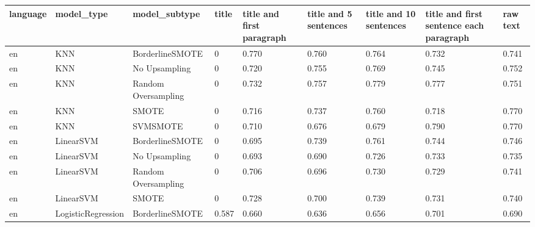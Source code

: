 \begin{tabular}{lllllllll}
\toprule
language &                   model\_type &       model\_subtype & title & title and first paragraph & title and 5 sentences & title and 10 sentences & title and first sentence each paragraph &  raw text \\
\midrule
      en &                          KNN &     BorderlineSMOTE &     0 &                     0.770 &                 0.760 &                  0.764 &                                   0.732 &     0.741 \\
      en &                          KNN &       No Upsampling &     0 &                     0.720 &                 0.755 &                  0.769 &                                   0.745 &     0.752 \\
      en &                          KNN & Random Oversampling &     0 &                     0.732 &                 0.757 &                  0.779 &                                   0.777 &     0.751 \\
      en &                          KNN &               SMOTE &     0 &                     0.716 &                 0.737 &                  0.760 &                                   0.718 &     0.770 \\
      en &                          KNN &            SVMSMOTE &     0 &                     0.710 &                 0.676 &                  0.679 &                                   0.790 &     0.770 \\
      en &                    LinearSVM &     BorderlineSMOTE &     0 &                     0.695 &                 0.739 &                  0.761 &                                   0.744 &     0.746 \\
      en &                    LinearSVM &       No Upsampling &     0 &                     0.693 &                 0.690 &                  0.726 &                                   0.733 &     0.735 \\
      en &                    LinearSVM & Random Oversampling &     0 &                     0.706 &                 0.696 &                  0.730 &                                   0.729 &     0.741 \\
      en &                    LinearSVM &               SMOTE &     0 &                     0.728 &                 0.700 &                  0.739 &                                   0.731 &     0.740 \\
      en &           LogisticRegression &     BorderlineSMOTE & 0.587 &                     0.660 &                 0.636 &                  0.656 &                                   0.701 &     0.690 \\

\end{tabular}
